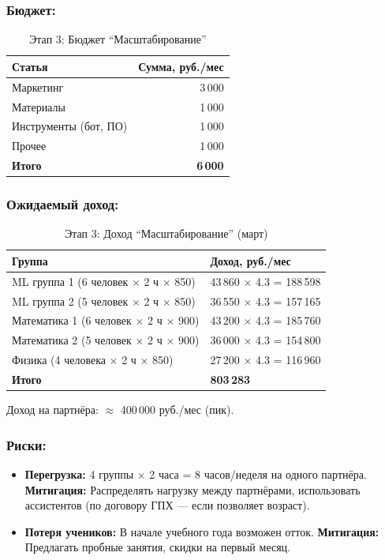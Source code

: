 \documentclass[12pt,a4paper]{article}
\begin{document}
\subsubsection*{Бюджет:}
\begin{table}[H]
\centering
\caption{Этап 3: Бюджет ``Масштабирование''}
\begin{tabular}{lr}
\toprule
Статья & Сумма, руб./мес \\
\midrule
Маркетинг & 3\,000 \\
Материалы & 1\,000 \\
Инструменты (бот, ПО) & 1\,000 \\
Прочее & 1\,000 \\
\midrule
\textbf{Итого} & \textbf{6\,000} \\
\bottomrule
\end{tabular}
\end{table}

\subsubsection*{Ожидаемый доход:}
\begin{table}[H]
\centering
\caption{Этап 3: Доход ``Масштабирование'' (март)}
\begin{tabular}{ll}
\toprule
Группа & Доход, руб./мес \\
\midrule
ML группа 1 (6 человек × 2 ч × 850) & 43\,860 × 4.3 = 188\,598 \\
ML группа 2 (5 человек × 2 ч × 850) & 36\,550 × 4.3 = 157\,165 \\
Математика 1 (6 человек × 2 ч × 900) & 43\,200 × 4.3 = 185\,760 \\
Математика 2 (5 человек × 2 ч × 900) & 36\,000 × 4.3 = 154\,800 \\
Физика (4 человека × 2 ч × 850) & 27\,200 × 4.3 = 116\,960 \\
\midrule
\textbf{Итого} & \textbf{803\,283} \\
\bottomrule
\end{tabular}
\end{table}

Доход на партнёра: ${\approx}$ 400\,000 руб./мес (пик).

\subsubsection*{Риски:}
\begin{itemize}
  \item \textbf{Перегрузка:} 4 группы × 2 часа = 8 часов/неделя на одного партнёра. \textbf{Митигация:} Распределять нагрузку между партнёрами, использовать ассистентов (по договору ГПХ --- если позволяет возраст).
  \item \textbf{Потеря учеников:} В начале учебного года возможен отток. \textbf{Митигация:} Предлагать пробные занятия, скидки на первый месяц.
\end{itemize}
\end{document}
